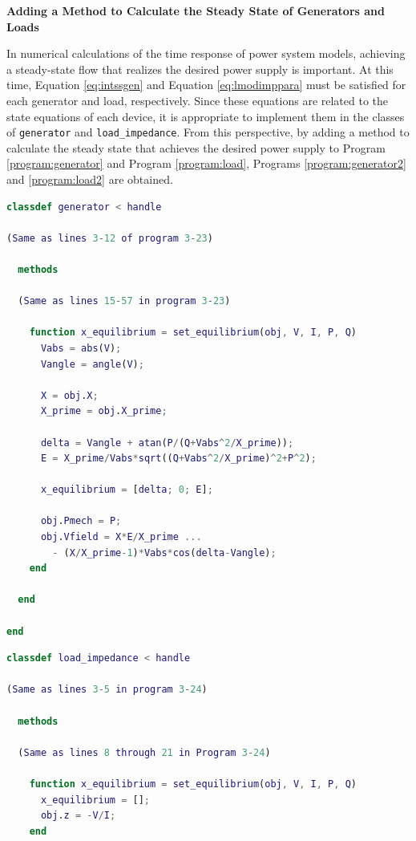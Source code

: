 \documentclass[graybox, envcountchap]{svmult}
\begin{document}
\begin{example}{\textbf{Adding a Method to Calculate the Steady State of Generators and
Loads}}

In numerical calculations of the time response of power system models, achieving
a steady-state flow that realizes the desired power supply is important. At this
time, Equation \ref{eq:intssgen} and Equation \ref{eq:lmodimppara} must be
satisfied for each generator and load, respectively. Since these equations are
related to the state equations of each device, it is appropriate to implement
them in the classes of \verb|generator| and \verb|load_impedance|. From this
perspective, by adding a method to calculate the steady state that achieves the
desired power supply to Program \ref{program:generator} and Program
\ref{program:load}, Programs \ref{program:generator2} and \ref{program:load2}
are obtained.


\begin{lstlisting}[language=Matlab, caption=generator.m, label={program:generator2}]
classdef generator < handle
  
(Same as lines 3-12 of program 3-23)

  methods

  (Same as lines 15-57 in program 3-23)

    function x_equilibrium = set_equilibrium(obj, V, I, P, Q)
      Vabs = abs(V);
      Vangle = angle(V);
      
      X = obj.X;
      X_prime = obj.X_prime;
      
      delta = Vangle + atan(P/(Q+Vabs^2/X_prime));
      E = X_prime/Vabs*sqrt((Q+Vabs^2/X_prime)^2+P^2);
      
      x_equilibrium = [delta; 0; E];
      
      obj.Pmech = P;
      obj.Vfield = X*E/X_prime ...
        - (X/X_prime-1)*Vabs*cos(delta-Vangle);
    end

  end
  
end
\end{lstlisting}


\begin{lstlisting}[language=Matlab, caption=load\_impedance.m, label={program:load2}]
classdef load_impedance < handle
  
(Same as lines 3-5 in program 3-24)

  methods
    
  (Same as lines 8 through 21 in Program 3-24)

    function x_equilibrium = set_equilibrium(obj, V, I, P, Q)
      x_equilibrium = [];
      obj.z = -V/I;
    end


\end{lstlisting}
\end{example}
\end{document}
